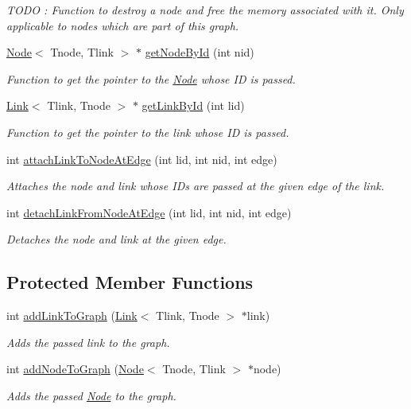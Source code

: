 \begin{DoxyCompactItemize}
\begin{DoxyCompactList}\small\item\em T\+O\+DO \+: Function to destroy a node and free the memory associated with it. Only applicable to nodes which are part of this graph. \end{DoxyCompactList}\item 
\hyperlink{classNode}{Node}$<$ Tnode, Tlink $>$ $\ast$ \hyperlink{classGraph_ad19bc391954e8df145149acfbdbba0cd}{get\+Node\+By\+Id} (int nid)
\begin{DoxyCompactList}\small\item\em Function to get the pointer to the \hyperlink{classNode}{Node} whose ID is passed. \end{DoxyCompactList}\item 
\hyperlink{classLink}{Link}$<$ Tlink, Tnode $>$ $\ast$ \hyperlink{classGraph_a2c205de5e88b199f24d1993e829df4b6}{get\+Link\+By\+Id} (int lid)
\begin{DoxyCompactList}\small\item\em Function to get the pointer to the link whose ID is passed. \end{DoxyCompactList}\item 
int \hyperlink{classGraph_ad7a9773e4b36196df9221116c8a7abd7}{attach\+Link\+To\+Node\+At\+Edge} (int lid, int nid, int edge)
\begin{DoxyCompactList}\small\item\em Attaches the node and link whose I\+Ds are passed at the given edge of the link. \end{DoxyCompactList}\item 
int \hyperlink{classGraph_a045bcbd5cfbbf87bc55deab5f0be477a}{detach\+Link\+From\+Node\+At\+Edge} (int lid, int nid, int edge)
\begin{DoxyCompactList}\small\item\em Detaches the node and link at the given edge. \end{DoxyCompactList}\end{DoxyCompactItemize}
\subsection*{Protected Member Functions}
\begin{DoxyCompactItemize}
\item 
int \hyperlink{classGraph_afe92a65949d7bdc372feb09f99e4f5cf}{add\+Link\+To\+Graph} (\hyperlink{classLink}{Link}$<$ Tlink, Tnode $>$ $\ast$link)
\begin{DoxyCompactList}\small\item\em Adds the passed link to the graph. \end{DoxyCompactList}\item 
int \hyperlink{classGraph_ab2a7e149c924c444167097295f404566}{add\+Node\+To\+Graph} (\hyperlink{classNode}{Node}$<$ Tnode, Tlink $>$ $\ast$node)
\begin{DoxyCompactList}\small\item\em Adds the passed \hyperlink{classNode}{Node} to the graph. \end{DoxyCompactList}\end{DoxyCompactItemize}
